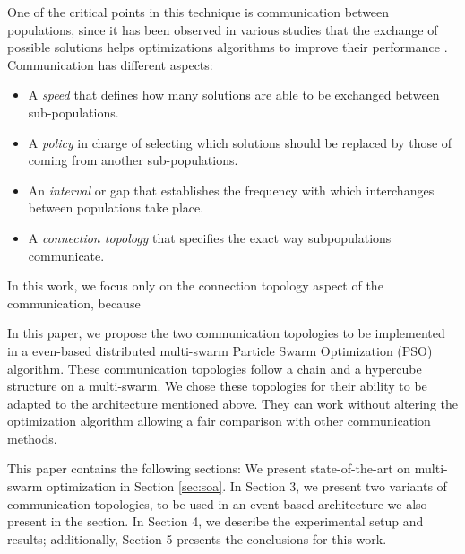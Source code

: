 \documentclass[runningheads]{llncs}
\begin{document}
One of the critical points in this technique is communication between
populations, since it has been observed in various studies that the
exchange of possible solutions helps optimizations algorithms to improve their 
performance \cite{a2}. Communication has different aspects:

\begin{itemize}
    \item A {\em speed} that defines how many solutions are able to be exchanged between sub-populations.
    \item A {\em policy} in charge of selecting which solutions should
      be replaced by those of coming from another sub-populations.
    \item An {\em interval} or gap that establishes the frequency with
      which interchanges between populations take place.
    \item A {\em connection topology} that specifies the exact way
      subpopulations communicate.
\end{itemize}



In this work, we focus only on the connection topology aspect of the 
communication, because    

In this paper, we propose the two communication topologies to be
implemented in a even-based distributed multi-swarm Particle Swarm
Optimization (PSO) algorithm.  These communication topologies follow a
chain and a hypercube structure on a multi-swarm. We chose these
topologies for their ability to be adapted to the architecture
mentioned above. They can work without altering the optimization
algorithm allowing a fair comparison with other communication methods.

This paper contains the following sections: We present
state-of-the-art on multi-swarm optimization in Section
\ref{sec:soa}. In Section 3, we present two variants of communication
topologies, to be used in an event-based architecture we also present
in the section. In Section 4, we describe the experimental setup and
results; additionally, Section 5 presents the conclusions for this
work.
\end{document}
